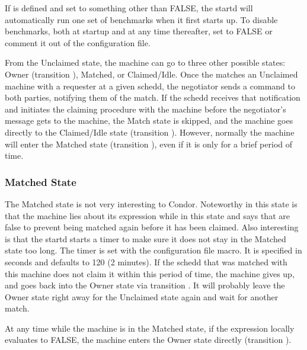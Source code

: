\Note If  is defined and set to something
other than FALSE, the startd will automatically run one set of
benchmarks when it first starts up.
To disable benchmarks, both at startup and at any time thereafter,
set  to FALSE or comment it out of the
configuration file.

From the Unclaimed state, the machine can go to three other possible
states: Owner (transition ), Matched, or Claimed/Idle.
Once the  matches an Unclaimed machine with a
requester at a given schedd, the negotiator sends a command to both
parties, notifying them of the match.  
If the schedd receives that notification and initiates the claiming
procedure with the machine before the negotiator's message gets to the
machine, the Match state is skipped,
and the machine goes
directly to the Claimed/Idle state (transition ).
However, normally the machine will enter the Matched state (transition
), even if it is only for a brief period of time.

\subsubsection{\label{sec:Matched-State}Matched State}

The Matched state is not very interesting to Condor.
Noteworthy in this state is that the machine lies about its 
expression while in this state and says that  are
false to prevent being matched again before it has been claimed.
Also interesting is that
the startd starts a timer to make sure it does not stay in the
Matched state too long.
The timer is set with the 
\label{param:MatchTimeout} configuration file macro.
It is specified in seconds and defaults to 120 (2 minutes).
If the schedd that was matched with this machine does not
claim it within this period of time, the machine gives up,
and goes back into the Owner state via transition .
It will probably leave the Owner state right away for the
Unclaimed state again and wait for another match. 

At any time while the machine is in the Matched state, if the
 expression locally evaluates to FALSE, the machine enters
the Owner state directly (transition ).

